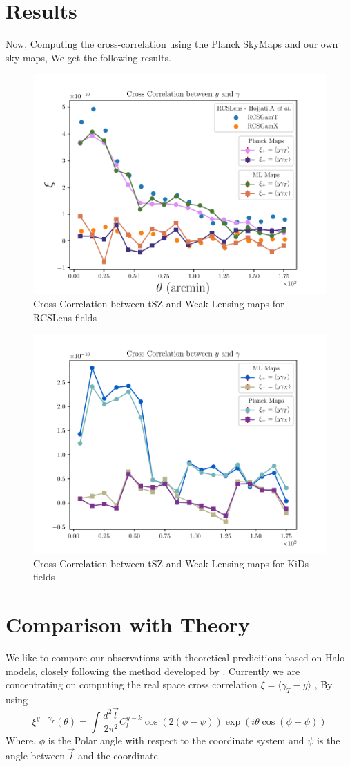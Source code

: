 \section{Results}
Now, Computing the cross-correlation using the Planck SkyMaps and our own sky maps, We get the following results.
\begin{figure}[H]
  \centering
  \includegraphics[width=0.7\linewidth]{plot_rcs.pdf}
  \caption{Cross Correlation between tSZ and Weak Lensing maps for RCSLens fields}
\end{figure}

\begin{figure}[H]
  \centering
  \includegraphics[width=0.7\linewidth]{plot_kids.pdf}
  \caption{Cross Correlation between tSZ and Weak Lensing maps for KiDs fields}
\end{figure}


\section{Comparison with Theory}
\label{theory}
We like to compare our observations with theoretical predicitions based on Halo models, closely
following the method developed by 
\cite{halotheoryma}. Currently we are concentrating on computing the real space cross correlation
$ \xi = \langle \gamma_T - y \rangle$ , By using
\begin{equation}
  \label{realcrosstheory}
  \xi^{y - \gamma_T} (\theta) = \int \frac{d^2 \vec{l}}{2\pi^2 } C_l^{y-k} \cos(2(\phi - \psi)) \exp(i \theta \cos(\phi - \psi))
\end{equation}
Where, $\phi$ is the Polar angle with respect to the coordinate system and $\psi$ is the angle
between $\vec{l}$ and the coordinate.


